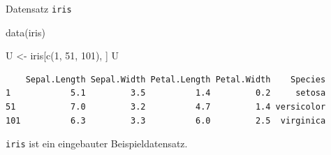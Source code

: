 \documentclass[
  10pt,
  ignorenonframetext,
  aspectratio=169,
]{beamer}
\newenvironment{Shaded}{}{}
\newcommand{\DecValTok}[1]{\textcolor[rgb]{0.25,0.63,0.44}{#1}}
\newcommand{\FunctionTok}[1]{\textcolor[rgb]{0.02,0.16,0.49}{#1}}
\newcommand{\NormalTok}[1]{#1}
\newcommand{\OtherTok}[1]{\textcolor[rgb]{0.00,0.44,0.13}{#1}}
\begin{document}
\begin{frame}[fragile]{Datensatz \texttt{iris}}
\label{datensatz-iris}
\begin{Shaded}
\begin{Highlighting}[]
\FunctionTok{data}\NormalTok{(iris)}

\NormalTok{U }\OtherTok{\textless{}{-}}\NormalTok{ iris[}\FunctionTok{c}\NormalTok{(}\DecValTok{1}\NormalTok{, }\DecValTok{51}\NormalTok{, }\DecValTok{101}\NormalTok{), ]}
\NormalTok{U}
\end{Highlighting}
\end{Shaded}

\begin{verbatim}
    Sepal.Length Sepal.Width Petal.Length Petal.Width    Species
1            5.1         3.5          1.4         0.2     setosa
51           7.0         3.2          4.7         1.4 versicolor
101          6.3         3.3          6.0         2.5  virginica
\end{verbatim}

\texttt{iris} ist ein eingebauter Beispieldatensatz.
\end{frame}
\end{document}
